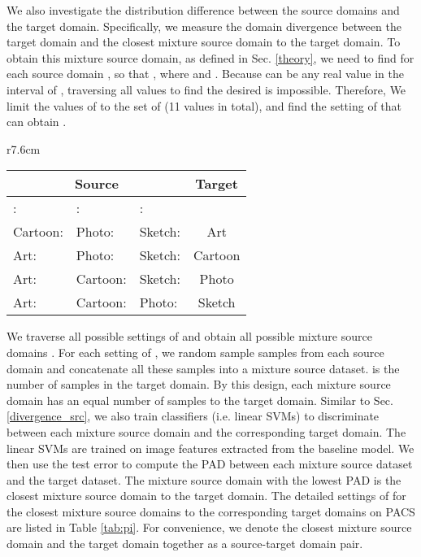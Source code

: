 \documentclass{article}
\begin{document}
We also investigate the distribution difference between the source domains and the target domain. Specifically, we measure the domain divergence between the target domain and the closest mixture source domain  to the target domain.
To obtain this mixture source domain, as defined in Sec. \ref{theory}, we need to find  for each source domain , so that , where  and . Because  can be any real value in the interval of , traversing all values to find the desired  is impossible. Therefore, We limit the values of  to the set of  (11 values in total), and find the setting of  that can obtain . 
\setlength{\tabcolsep}{6pt}
\begin{wraptable}{r}{7.6cm}
\caption{The settings of  for the closest mixture source domains to the target domains on PACS.}
\begin{center}
\footnotesize
\begin{tabular}{l|l|l|c}
\hline
\multicolumn{3}{c|}{Source} & Target\\
\hline
:  & :  & :  &  \\
\hline
\hline
Cartoon:  & Photo:  & Sketch:  & Art \\
\hline
Art:  & Photo:  & Sketch:  & Cartoon \\
\hline
Art:  & Cartoon:  & Sketch:  & Photo \\
\hline
Art:  & Cartoon:  & Photo:  & Sketch \\
\hline
\end{tabular}
\end{center}
\label{tab:pi}
\end{wraptable}
We traverse all possible settings of  and obtain all possible mixture source domains . For each setting of , we random sample  samples from each source domain  and concatenate all these samples into a mixture source dataset.  is the number of samples in the target domain. By this design, each mixture source domain has an equal number of samples to the target domain. Similar to Sec. \ref{divergence_src}, we also train classifiers (i.e. linear SVMs) to discriminate between each mixture source domain and the corresponding target domain. The linear SVMs are trained on image features extracted from the baseline model. We then use the test error to compute the PAD between each mixture source dataset and the target dataset. The mixture source domain with the lowest PAD is the closest mixture source domain  to the target domain. The detailed settings of  for the closest mixture source domains to the corresponding target domains on PACS are listed in Table \ref{tab:pi}. For convenience, we denote the closest mixture source domain  and the target domain  together as a source-target domain pair.
\end{document}
